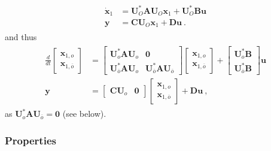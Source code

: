 \documentclass[letterpaper,10pt,english]{jupyterBook}
\begin{document}
\begin{equation*}
\begin{split}\begin{aligned}
  \dot{\mathbf{x}}_1 & = \mathbf{U}_O^* \mathbf{A} \mathbf{U}_O \mathbf{x}_1 + \mathbf{U}_O^* \mathbf{B} \mathbf{u} \\
       \mathbf{y}    & = \mathbf{C} \mathbf{U}_O \mathbf{x}_1 + \mathbf{D} \mathbf{u} \ .
\end{aligned}\end{split}
\end{equation*}
\sphinxAtStartPar
and thus
\begin{equation*}
\begin{split}\begin{aligned}
 \frac{d}{dt} \begin{bmatrix} \mathbf{x}_{1,o} \\ \mathbf{x}_{1,\overline{o}} \end{bmatrix} & = \begin{bmatrix} \mathbf{U}_o^* \mathbf{A} \mathbf{U}_o & \mathbf{0} \\ \mathbf{U}_{\overline{o}}^* \mathbf{A} \mathbf{U}_{o} & \mathbf{U}_{\overline{o}}^* \mathbf{A} \mathbf{U}_{\overline{o}} \end{bmatrix} \begin{bmatrix} \mathbf{x}_{1,o} \\ \mathbf{x}_{1,\overline{o}} \end{bmatrix} + \begin{bmatrix} \mathbf{U}_o^* \mathbf{B} \\ \mathbf{U}_{\overline{o}}^* \mathbf{B} \end{bmatrix} \mathbf{u} \\ 
  \mathbf{y} & = \begin{bmatrix} \mathbf{C} \mathbf{U}_o & \mathbf{0} \end{bmatrix} \begin{bmatrix} \mathbf{x}_{1,o} \\ \mathbf{x}_{1, \overline{o}} \end{bmatrix} + \mathbf{D} \mathbf{u} \ ,
\end{aligned}\end{split}
\end{equation*}
\sphinxAtStartPar
as \(\mathbf{U}_o^* \mathbf{A} \mathbf{U}_{\overline{o}} = \mathbf{0}\) (see below).
\subsubsection*{Properties}
\end{document}
